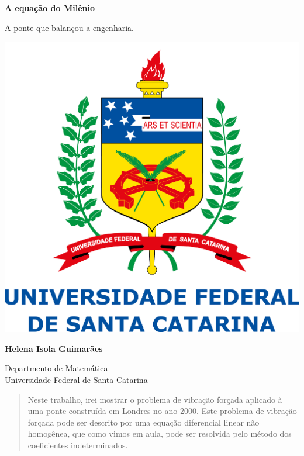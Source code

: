 \documentclass[]{article}
\begin{document}
\begin{titlepage}
    \begin{center}
        \vspace*{1cm}
        \huge
        \textbf{A equação do Milênio} %
        
        \large
        \vspace{0.5cm}
         A ponte que balançou a engenharia.
             
        \vspace{0.5cm}

        \includegraphics[width=1\textwidth]{logoUfsc.png}

        \vspace{0.8cm}
        \textbf{Helena Isola Guimarães}
        \vspace{0.8cm}
             
        Departmento de Matemática\\
        Universidade Federal de Santa Catarina\\
             
    \end{center}
\end{titlepage}

\begin{abstract}
    Neste trabalho, irei mostrar o problema de vibração forçada aplicado à uma ponte construída em Londres no ano 2000.
Este problema de vibração forçada pode ser descrito por uma equação diferencial linear não homogênea, que como vimos em aula,
pode ser resolvida pelo método dos coeficientes indeterminados.
\end{abstract}
\pagebreak 
\end{document}
